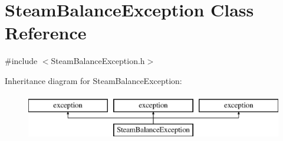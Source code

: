 \hypertarget{class_steam_balance_exception}{}\section{Steam\+Balance\+Exception Class Reference}
\label{class_steam_balance_exception}


{\ttfamily \#include $<$Steam\+Balance\+Exception.\+h$>$}

Inheritance diagram for Steam\+Balance\+Exception\+:\begin{figure}[H]
\begin{center}
\leavevmode
\includegraphics[height=2.000000cm]{da/d91/class_steam_balance_exception}
\end{center}
\end{figure}
